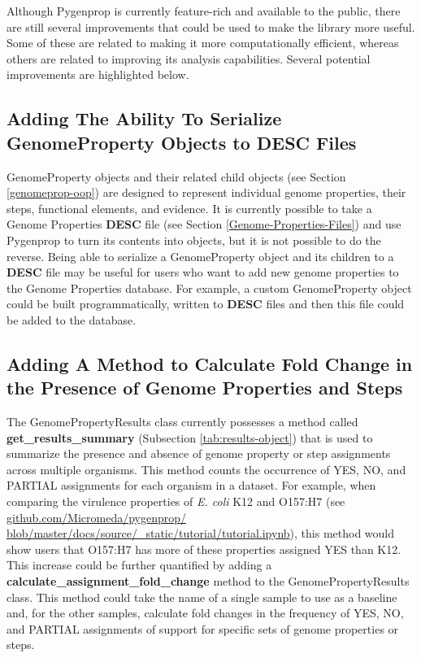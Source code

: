 Although Pygenprop is currently feature-rich and available to the public, there are still several improvements that could be used to make the library more useful. Some of these are related to making it more computationally efficient, whereas others are related to improving its analysis capabilities. Several potential improvements are highlighted below.

\subsection{Adding The Ability To Serialize GenomeProperty Objects to DESC Files}

GenomeProperty objects and their related child objects (see Section \ref{genomeprop-oop}) are designed to represent individual genome properties, their steps, functional elements, and evidence. It is currently possible to take a Genome Properties \textbf{DESC} file (see Section \ref{Genome-Properties-Files}) and use Pygenprop to turn its contents into objects, but it is not possible to do the reverse. Being able to serialize a GenomeProperty object and its children to a \textbf{DESC} file may be useful for users who want to add new genome properties to the Genome Properties database. For example, a custom GenomeProperty object could be built programmatically, written to \textbf{DESC} files and then this file could be added to the database.

\subsection{Adding A Method to Calculate Fold Change in the Presence of Genome Properties and Steps}

The GenomePropertyResults class currently possesses a method called \textbf{get\_results\_summary} (Subsection \ref{tab:results-object}) that is used to summarize the presence and absence of genome property or step assignments across multiple organisms. This method counts the occurrence of YES, NO, and PARTIAL assignments for each organism in a dataset. For example, when comparing the virulence properties of \textit{E. coli} K12 and O157:H7 (see \href{github.com/Micromeda/pygenprop/blob/master/docs/source/\_static/tutorial/tutorial.ipynb}{github.com/Micromeda/pygenprop/ \\blob/master/docs/source/\_static/tutorial/tutorial.ipynb}), this method would show users that O157:H7 has more of these properties assigned YES than K12. This increase could be further quantified by adding a \textbf{calculate\_assignment\_fold\_change} method to the GenomePropertyResults class. This method could take the name of a single sample to use as a baseline and, for the other samples, calculate fold changes in the frequency of YES, NO, and PARTIAL assignments of support for specific sets of genome properties or steps.

